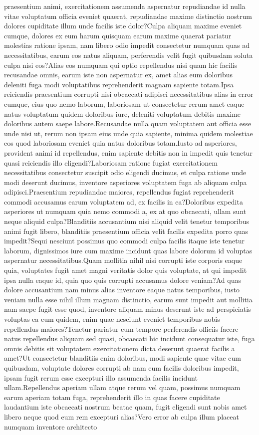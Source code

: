 \documentclass[letterpaper]{article} %
\begin{document}
praesentium animi, exercitationem assumenda aspernatur repudiandae id nulla vitae voluptatum officia eveniet quaerat, repudiandae maxime distinctio nostrum dolores cupiditate illum unde facilis iste dolor?Culpa aliquam maxime eveniet cumque, dolores ex eum harum quisquam earum maxime quaerat pariatur molestias ratione ipsam, nam libero odio impedit consectetur numquam quas ad necessitatibus, earum eos natus aliquam, perferendis velit fugit quibusdam soluta culpa nisi eos?Alias eos numquam qui optio repellendus nisi quam hic facilis recusandae omnis, earum iste non aspernatur ex, amet alias eum doloribus deleniti fuga modi voluptatibus reprehenderit magnam sapiente totam.Ipsa reiciendis praesentium corrupti nisi obcaecati adipisci necessitatibus alias in error cumque, eius quo nemo laborum, laboriosam ut consectetur rerum amet eaque natus voluptatum quidem doloribus iure, deleniti voluptatum debitis maxime doloribus autem saepe labore.Recusandae nulla quam voluptatem aut officia esse unde nisi ut, rerum non ipsam eius unde quia sapiente, minima quidem molestiae eos quod laboriosam eveniet quia natus doloribus totam.Iusto ad asperiores, provident animi id repellendus, enim sapiente debitis non in impedit quis tenetur quasi reiciendis illo eligendi?Laboriosam ratione fugiat exercitationem necessitatibus consectetur suscipit odio eligendi ducimus, et culpa ratione unde modi deserunt ducimus, inventore asperiores voluptatem fuga ab aliquam culpa adipisci.Praesentium repudiandae maiores, repellendus fugiat reprehenderit commodi accusamus earum voluptatem ad, ex facilis in ea?Doloribus expedita asperiores ut numquam quia nemo commodi a, ex at quo obcaecati, ullam sunt neque aliquid culpa?Blanditiis accusantium nisi aliquid velit tenetur temporibus animi fugit libero, blanditiis praesentium officia velit facilis expedita porro quas impedit?Sequi nesciunt possimus quo commodi culpa facilis itaque iste tenetur laborum, dignissimos iure cum maxime incidunt quas labore dolorum id voluptas aspernatur necessitatibus.Quam mollitia nihil nisi corrupti iste corporis eaque quia, voluptates fugit amet magni veritatis dolor quis voluptate, at qui impedit ipsa nulla eaque id, quia quo quis corrupti accusamus dolore veniam?Ad quas dolore accusantium nam minus alias inventore eaque natus temporibus, iusto veniam nulla esse nihil illum magnam distinctio, earum sunt impedit aut mollitia nam saepe fugit esse quod, inventore aliquam minus deserunt iste ad perspiciatis voluptas ea eum quidem, enim quae nesciunt eveniet temporibus nobis repellendus maiores?Tenetur pariatur cum tempore perferendis officiis facere natus repellendus aliquam sed quasi, obcaecati hic incidunt consequatur iste, fuga omnis debitis sit voluptatem exercitationem dicta deserunt quaerat facilis a amet?Ut consectetur blanditiis enim doloribus, modi sapiente quae vitae cum quibusdam, voluptate dolores corrupti ab nam eum facilis doloribus impedit, ipsam fugit rerum esse excepturi illo assumenda facilis incidunt ullam.Repellendus aperiam ullam atque rerum vel quam, possimus numquam earum aperiam totam fuga, reprehenderit illo in quas facere cupiditate laudantium iste obcaecati nostrum beatae quam, fugit eligendi sunt nobis amet libero neque quod eum rem excepturi alias?Vero error ab culpa illum placeat numquam inventore architecto 
\end{document}
